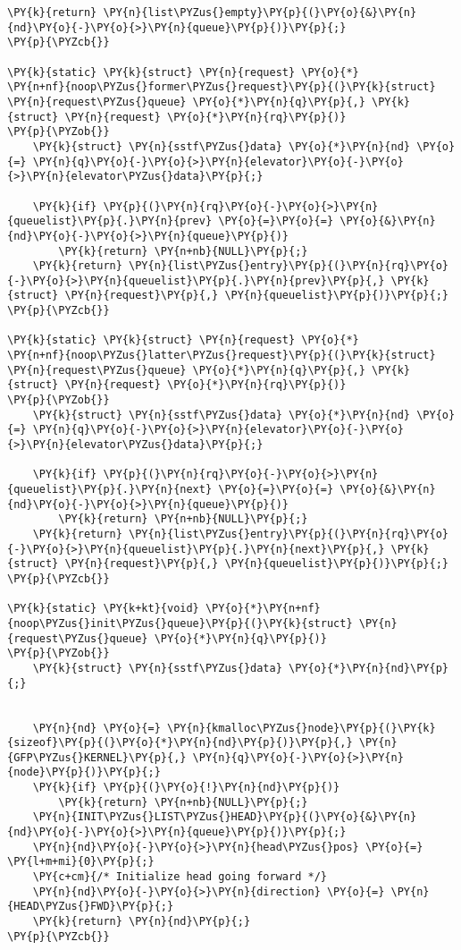 \begin{Verbatim}[commandchars=\\\{\}]
	\PY{k}{return} \PY{n}{list\PYZus{}empty}\PY{p}{(}\PY{o}{&}\PY{n}{nd}\PY{o}{-}\PY{o}{>}\PY{n}{queue}\PY{p}{)}\PY{p}{;}
\PY{p}{\PYZcb{}}

\PY{k}{static} \PY{k}{struct} \PY{n}{request} \PY{o}{*}
\PY{n+nf}{noop\PYZus{}former\PYZus{}request}\PY{p}{(}\PY{k}{struct} \PY{n}{request\PYZus{}queue} \PY{o}{*}\PY{n}{q}\PY{p}{,} \PY{k}{struct} \PY{n}{request} \PY{o}{*}\PY{n}{rq}\PY{p}{)}
\PY{p}{\PYZob{}}
	\PY{k}{struct} \PY{n}{sstf\PYZus{}data} \PY{o}{*}\PY{n}{nd} \PY{o}{=} \PY{n}{q}\PY{o}{-}\PY{o}{>}\PY{n}{elevator}\PY{o}{-}\PY{o}{>}\PY{n}{elevator\PYZus{}data}\PY{p}{;}

	\PY{k}{if} \PY{p}{(}\PY{n}{rq}\PY{o}{-}\PY{o}{>}\PY{n}{queuelist}\PY{p}{.}\PY{n}{prev} \PY{o}{=}\PY{o}{=} \PY{o}{&}\PY{n}{nd}\PY{o}{-}\PY{o}{>}\PY{n}{queue}\PY{p}{)}
		\PY{k}{return} \PY{n+nb}{NULL}\PY{p}{;}
	\PY{k}{return} \PY{n}{list\PYZus{}entry}\PY{p}{(}\PY{n}{rq}\PY{o}{-}\PY{o}{>}\PY{n}{queuelist}\PY{p}{.}\PY{n}{prev}\PY{p}{,} \PY{k}{struct} \PY{n}{request}\PY{p}{,} \PY{n}{queuelist}\PY{p}{)}\PY{p}{;}
\PY{p}{\PYZcb{}}

\PY{k}{static} \PY{k}{struct} \PY{n}{request} \PY{o}{*}
\PY{n+nf}{noop\PYZus{}latter\PYZus{}request}\PY{p}{(}\PY{k}{struct} \PY{n}{request\PYZus{}queue} \PY{o}{*}\PY{n}{q}\PY{p}{,} \PY{k}{struct} \PY{n}{request} \PY{o}{*}\PY{n}{rq}\PY{p}{)}
\PY{p}{\PYZob{}}
	\PY{k}{struct} \PY{n}{sstf\PYZus{}data} \PY{o}{*}\PY{n}{nd} \PY{o}{=} \PY{n}{q}\PY{o}{-}\PY{o}{>}\PY{n}{elevator}\PY{o}{-}\PY{o}{>}\PY{n}{elevator\PYZus{}data}\PY{p}{;}

	\PY{k}{if} \PY{p}{(}\PY{n}{rq}\PY{o}{-}\PY{o}{>}\PY{n}{queuelist}\PY{p}{.}\PY{n}{next} \PY{o}{=}\PY{o}{=} \PY{o}{&}\PY{n}{nd}\PY{o}{-}\PY{o}{>}\PY{n}{queue}\PY{p}{)}
		\PY{k}{return} \PY{n+nb}{NULL}\PY{p}{;}
	\PY{k}{return} \PY{n}{list\PYZus{}entry}\PY{p}{(}\PY{n}{rq}\PY{o}{-}\PY{o}{>}\PY{n}{queuelist}\PY{p}{.}\PY{n}{next}\PY{p}{,} \PY{k}{struct} \PY{n}{request}\PY{p}{,} \PY{n}{queuelist}\PY{p}{)}\PY{p}{;}
\PY{p}{\PYZcb{}}

\PY{k}{static} \PY{k+kt}{void} \PY{o}{*}\PY{n+nf}{noop\PYZus{}init\PYZus{}queue}\PY{p}{(}\PY{k}{struct} \PY{n}{request\PYZus{}queue} \PY{o}{*}\PY{n}{q}\PY{p}{)}
\PY{p}{\PYZob{}}
	\PY{k}{struct} \PY{n}{sstf\PYZus{}data} \PY{o}{*}\PY{n}{nd}\PY{p}{;}
	

	\PY{n}{nd} \PY{o}{=} \PY{n}{kmalloc\PYZus{}node}\PY{p}{(}\PY{k}{sizeof}\PY{p}{(}\PY{o}{*}\PY{n}{nd}\PY{p}{)}\PY{p}{,} \PY{n}{GFP\PYZus{}KERNEL}\PY{p}{,} \PY{n}{q}\PY{o}{-}\PY{o}{>}\PY{n}{node}\PY{p}{)}\PY{p}{;}
	\PY{k}{if} \PY{p}{(}\PY{o}{!}\PY{n}{nd}\PY{p}{)}
		\PY{k}{return} \PY{n+nb}{NULL}\PY{p}{;}
	\PY{n}{INIT\PYZus{}LIST\PYZus{}HEAD}\PY{p}{(}\PY{o}{&}\PY{n}{nd}\PY{o}{-}\PY{o}{>}\PY{n}{queue}\PY{p}{)}\PY{p}{;}
	\PY{n}{nd}\PY{o}{-}\PY{o}{>}\PY{n}{head\PYZus{}pos} \PY{o}{=} \PY{l+m+mi}{0}\PY{p}{;}
	\PY{c+cm}{/* Initialize head going forward */}
	\PY{n}{nd}\PY{o}{-}\PY{o}{>}\PY{n}{direction} \PY{o}{=} \PY{n}{HEAD\PYZus{}FWD}\PY{p}{;}
	\PY{k}{return} \PY{n}{nd}\PY{p}{;}
\PY{p}{\PYZcb{}}


\end{Verbatim}
